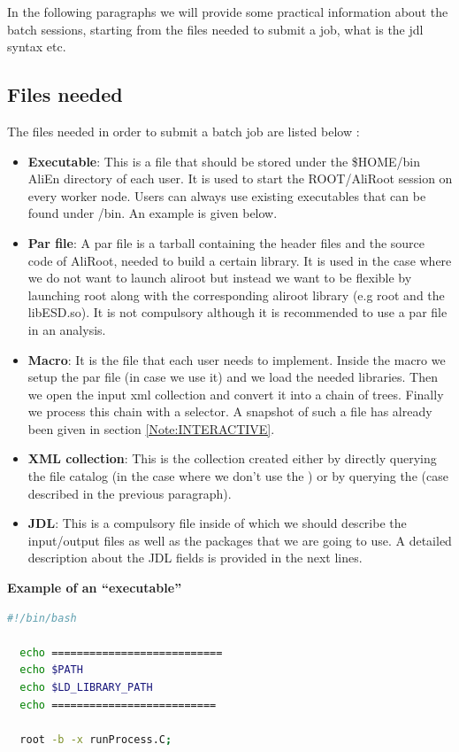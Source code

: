 In the following paragraphs we will provide some practical information about the batch sessions, starting from the files needed to submit a job, what is the jdl syntax etc.

\subsection{Files needed}

The files needed in order to submit a batch job are listed below \cite{Note:RefAlienTutorial}:

\begin{itemize}
\item \textbf{Executable}: This is a file that should be stored under the \$HOME/bin AliEn directory of each user. It is used to start the ROOT/AliRoot session on every worker node. Users can always use existing executables that can be found under /bin. An example is given below.
\item \textbf{Par file}: A {\ttfamily par file} is a tarball containing the header files and the source code of AliRoot, needed to build a certain library. It is used in the case where we do not want to launch aliroot but instead we want to be flexible by launching root along with the corresponding aliroot library (e.g root and the libESD.so). It is not compulsory although it is recommended to use a par file in an analysis.
\item \textbf{Macro}: It is the file that each user needs to implement. Inside the macro we setup the par file (in case we use it) and we load the needed libraries. Then we open the input xml collection and convert it into a chain of trees. Finally we process this chain with a selector. A snapshot of such a file has already been given in section \ref{Note:INTERACTIVE}.
\item \textbf{XML collection}: This is the collection created either by directly querying the file catalog (in the case where we don't use the \tag) or by querying the \tag (case described in the previous paragraph).
\item \textbf{JDL}: This is a compulsory file inside of which we should describe the input/output files as well as the packages that we are going to use. A detailed description about the JDL fields is provided in the next lines.
\end{itemize}

\textbf{Example of an ``executable''}
\begin{lstlisting}[language=bash]
  #!/bin/bash
  
  echo ===========================
  echo $PATH
  echo $LD_LIBRARY_PATH
  echo ==========================
  
  root -b -x runProcess.C;
\end{lstlisting}

